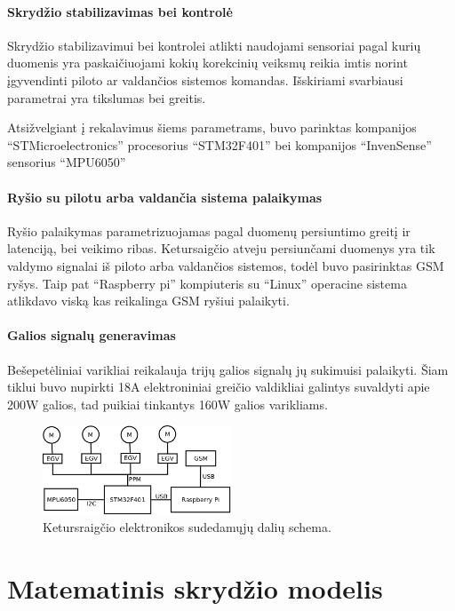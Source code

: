\documentclass[12pt, a4paper, lithuanian, final]{article}
\begin{document}
\paragraph{Skrydžio stabilizavimas bei kontrolė}
Skrydžio stabilizavimui bei kontrolei atlikti naudojami sensoriai pagal kurių duomenis yra paskaičiuojami kokių korekcinių veiksmų reikia imtis norint įgyvendinti piloto ar valdančios sistemos komandas.
Išskiriami svarbiausi parametrai yra tikslumas bei greitis.

Atsižvelgiant į rekalavimus šiems parametrams, buvo parinktas kompanijos "`STMicroelectronics"' procesorius "`STM32F401"' bei kompanijos "`InvenSense"' sensorius "`MPU6050"'

\paragraph{Ryšio su pilotu arba valdančia sistema palaikymas}
Ryšio palaikymas parametrizuojamas pagal duomenų persiuntimo greitį ir latenciją, bei veikimo ribas.
Ketursaigčio atveju persiunčami duomenys yra tik valdymo signalai iš piloto arba valdančios sistemos, todėl buvo pasirinktas GSM ryšys.
Taip pat "`Raspberry pi"' kompiuteris su "`Linux"' operacine sistema atlikdavo viską kas reikalinga GSM ryšiui palaikyti.

\paragraph{Galios signalų generavimas}
Bešepetėliniai varikliai reikalauja trijų galios signalų jų sukimuisi palaikyti.
Šiam tiklui buvo nupirkti 18A elektroniniai greičio valdikliai galintys suvaldyti apie 200W galios, tad puikiai tinkantys 160W galios varikliams.

\begin{figure}[H]
\begin{center}
\includegraphics[width=0.5\textwidth]{img/elektronikosSchema.png}
\caption{Ketursraigčio elektronikos sudedamųjų dalių schema.}
\end{center}
\end{figure}




\section{Matematinis skrydžio modelis}
\end{document}
